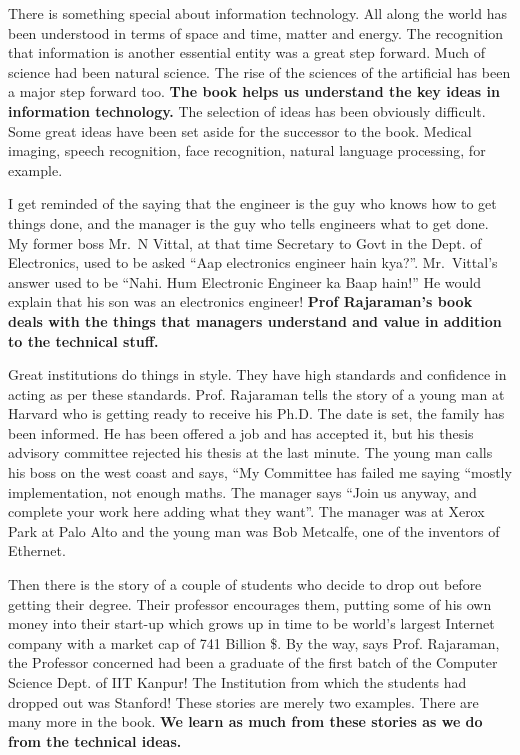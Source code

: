 \begin{multicols}{2}
There is something special about information technology. All along the world has been understood in terms of space and time, matter and energy. The recognition that information is another essential entity was a great step forward. Much of science had been natural science. The rise of the sciences of the artificial has been a major step forward too. \textbf{The book helps us understand the key ideas in information technology.} The selection of ideas has been obviously difficult. Some great ideas have been set aside for the successor to the book. Medical imaging, speech recognition, face recognition, natural language processing, for example. 

I get reminded of the saying that the engineer is the guy who knows how to get things done, and the manager is the guy who tells engineers what to get done. My former boss Mr.~N Vittal, at that time Secretary to Govt in the Dept. of Electronics, used to be asked “Aap electronics engineer hain kya?”. Mr.~Vittal’s answer used to be “Nahi. Hum Electronic Engineer ka Baap hain!” He would explain that his son was an electronics engineer! \textbf{Prof Rajaraman’s book deals with the things that managers understand and value in addition to the technical stuff.}

Great institutions do things in style. They have high standards and confidence in acting as per these standards. Prof. Rajaraman tells the story of a young man at Harvard who is getting ready to receive his Ph.D. The date is set, the family has been informed. He has been offered a job and has accepted it, but his thesis advisory committee rejected his thesis at the last minute. The young man calls his boss on the west coast and says, “My Committee has failed me saying “mostly implementation, not enough maths. The manager says “Join us anyway, and complete your work here adding what they want”. The manager was at Xerox Park at Palo Alto and the young man was Bob Metcalfe, one of the inventors of Ethernet.

Then there is the story of a couple of students who decide to drop out before getting their degree. Their professor encourages them, putting some of his own money into their start-up which grows up in time to be world’s largest Internet company with a market cap of 741 Billion \$. By the way, says Prof. Rajaraman, the Professor concerned had been a graduate of the first batch of the Computer Science Dept. of IIT Kanpur! The Institution from which the students had dropped out was Stanford!  These stories are merely two examples. There are many more in the book. \textbf{We learn as much from these stories as we do from the technical ideas.}


\end{multicols}
